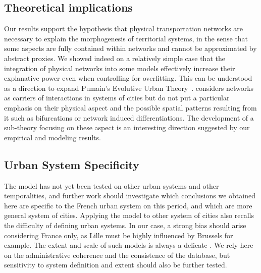 \documentclass[Royal,sageh,times]{sagej}
\begin{document}

\subsection*{Theoretical implications}


Our results support the hypothesis that physical transportation networks are necessary to explain the morphogenesis of territorial systems, in the sense that some aspects are fully contained within networks and cannot be approximated by abstract proxies. We showed indeed on a relatively simple case that the integration of physical networks into some models effectively increase their explanative power even when controlling for overfitting. This can be understood as a direction to expand Pumain's Evolutive Urban Theory~\citep{pumain1997pour}.  considers networks as carriers of interactions in systems of cities but do not put a particular emphasis on their physical aspect and the possible spatial patterns resulting from it such as bifurcations or network induced differentiations. The development of a sub-theory focusing on these aspect is an interesting direction suggested by our empirical and modeling results.


\subsection*{Urban System Specificity}


The model has not yet been tested on other urban systems and other temporalities, and further work should investigate which conclusions we obtained here are specific to the French urban system on this period, and which are more general  system of cities. Applying the model to other system of cities also recalls the difficulty of defining urban systems. In our case, a strong bias should arise  considering France only, as Lille must be highly influenced by Brussels for example. The extent and scale of such models is always a delicate . We rely here on the administrative coherence and the consistence of the database, but sensitivity to system definition and extent should also be further tested.
\end{document}
